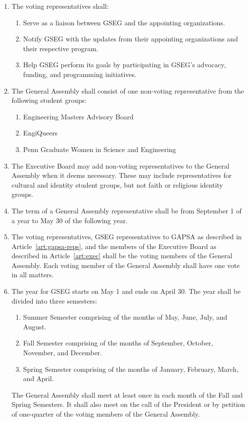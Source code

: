 \begin{enumerate}[label=\Alph*.]
	\item The voting representatives shall:
	\begin{enumerate}
		\item Serve as a liaison between GSEG and the appointing organizations.
		\item Notify GSEG with the updates from their appointing organizations and their
		respective program.
		\item Help GSEG perform its goals by participating in GSEG's advocacy, funding,
		and programming initiatives.
	\end{enumerate}

	\item The General Assembly shall consist of one non-voting representative from the following
	student groups:
	\begin{enumerate}[label=(\roman*)]
		\item Engineering Masters Advisory Board
		\item EngiQueers
		\item Penn Graduate Women in Science and Engineering
	\end{enumerate}

	\item The Executive Board may add non-voting representatives to the General Assembly 
	when it deems necessary. These may include representatives for cultural and identity
	student groups, but	not faith or religious identity groups.  

	\item The term of a General Assembly representative shall be from September 1 of a year to 
	May 30 of the following year. 

	\item The voting representatives, GSEG representatives to GAPSA as described in 
	Article~\ref{art:gapsa-reps}, and the members of the Executive Board as described in 
	Article~\ref{art:exec} shall be the voting members of the General Assembly. Each voting member
	of the General Assembly	shall have one vote in all matters. 

	\item The year for GSEG starts on May 1 and ends on April 30. The year shall be divided into three semesters:
	\begin{enumerate}[label=(\roman*)]
		\item Summer Semester comprising of the months of May, June, July, and August. 
		\item Fall Semester comprising of the months of September, October, November, and December.
		\item Spring Semester comprising of the months of January, February, March, and April.
	\end{enumerate}
	The General Assembly shall meet at least once in each month of the Fall and Spring Semesters.
	It shall also meet on the call of the President or by petition of one-quarter of the voting
	members of the General Assembly.


\end{enumerate}
